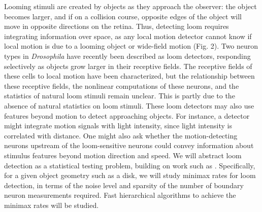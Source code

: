 Looming stimuli are created by objects as they approach the observer:
the object becomes larger, and if on a collision course,
opposite edges of the object will move in opposite directions on the
retina. Thus, detecting loom requires integrating information over
space, as any local motion detector cannot know if local motion is due
to a looming object or wide-field motion (Fig. 2). Two neuron types in
\textit{Drosophila} have recently been described as loom detectors,
responding selectively as objects grow larger in their receptive
fields. The receptive fields of these cells to local motion have been
characterized, but the relationship between these receptive fields,
the nonlinear computations of these neurons, and the statistics of
natural loom stimuli remain unclear. This is partly due to the
absence of natural statistics on loom stimuli. These loom detectors 
may also use features beyond motion to
detect approaching objects. For instance, a detector might integrate
motion signals with light intensity, since light intensity
is correlated with distance. One might also ask whether the
motion-detecting neurons upstream of the loom-sensitive neurons could
convey information about stimulus features beyond motion
direction and speed. We will abstract loom detection as a statistical
testing problem, building on work such
as \citep{castro:05}. %
Specifically, for a given object
geometry such as a disk, we will study minimax rates for loom
detection, in terms of the noise level and sparsity of the number of
boundary neuron measurements required. Fast hierarchical algorithms
to achieve the minimax rates will be studied.



